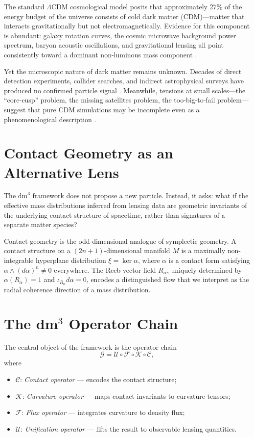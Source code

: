 \documentclass[11pt,a4paper,openright]{book}
\theoremstyle{dm3thm}
\theoremstyle{dm3def}
\newcommand{\dm}{\mathrm{dm}^3}
\newcommand{\Ralf}{R_\alpha}
\newcommand{\GG}{\mathcal{G}}
\newcommand{\UU}{\mathcal{U}}
\newcommand{\FF}{\mathcal{F}}
\newcommand{\KK}{\mathcal{K}}
\newcommand{\CC}{\mathcal{C}}
\begin{document}
The standard $\Lambda$CDM cosmological model posits that approximately 27\% of
the energy budget of the universe consists of cold dark matter (CDM)---matter
that interacts gravitationally but not electromagnetically.  Evidence for this
component is abundant: galaxy rotation curves, the cosmic microwave background
power spectrum, baryon acoustic oscillations, and gravitational lensing all
point consistently toward a dominant non-luminous mass component
\citep{PlanckCollaboration2020}.

Yet the microscopic nature of dark matter remains unknown.  Decades of direct
detection experiments, collider searches, and indirect astrophysical surveys
have produced no confirmed particle signal \citep{Aprile2018}.  Meanwhile,
tensions at small scales---the ``core-cusp'' problem, the missing satellites
problem, the too-big-to-fail problem---suggest that pure CDM simulations may
be incomplete even as a phenomenological description
\citep{BullockBoylanKolchin2017}.

\section{Contact Geometry as an Alternative Lens}

The $\dm$ framework does not propose a new particle.  Instead, it asks: what
if the effective mass distributions inferred from lensing data are geometric
invariants of the underlying contact structure of spacetime, rather than
signatures of a separate matter species?

Contact geometry is the odd-dimensional analogue of symplectic geometry.  A
contact structure on a $(2n+1)$-dimensional manifold $M$ is a maximally
non-integrable hyperplane distribution $\xi = \ker\alpha$, where $\alpha$ is a
contact form satisfying $\alpha \wedge (d\alpha)^n \neq 0$ everywhere.  The
Reeb vector field $\Ralf$, uniquely determined by $\alpha(\Ralf)=1$ and
$\iota_{\Ralf}d\alpha = 0$, encodes a distinguished flow that we interpret as
the radial coherence direction of a mass distribution.

\section{The dm$^3$ Operator Chain}

The central object of the framework is the operator chain
\begin{equation}\label{eq:chain}
  \GG = \UU \circ \FF \circ \KK \circ \CC,
\end{equation}
where
\begin{itemize}
  \item $\CC$: \emph{Contact operator} — encodes the contact structure;
  \item $\KK$: \emph{Curvature operator} — maps contact invariants to curvature tensors;
  \item $\FF$: \emph{Flux operator} — integrates curvature to density flux;
  \item $\UU$: \emph{Unification operator} — lifts the result to observable lensing quantities.
\end{itemize}
\end{document}
